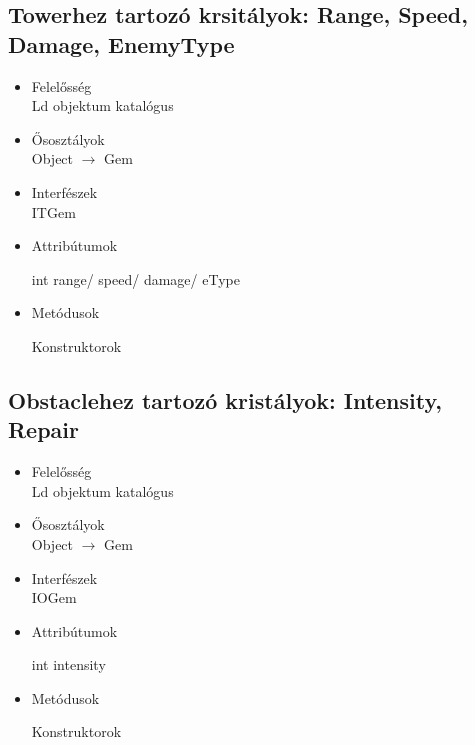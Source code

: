 \subsection{Towerhez tartozó krsitályok: Range, Speed, Damage, EnemyType}
\begin{itemize}
\item Felelősség\\
Ld objektum katalógus
\item Ősosztályok\\
Object $\rightarrow$ Gem
\item Interfészek\\
ITGem
\item Attribútumok\\
	\begin{description}
		\item[int range/ speed/ damage/ eType] 
		
	\end{description}
\item Metódusok\\
	\begin{description}
		\item[Konstruktorok]
		
	\end{description}
\end{itemize}
\subsection{Obstaclehez tartozó kristályok: Intensity, Repair}
\begin{itemize}
\item Felelősség\\
Ld objektum katalógus
\item Ősosztályok\\
Object $\rightarrow$ Gem
\item Interfészek\\
IOGem

\item Attribútumok\\
	\begin{description}
		\item[int intensity] 
		
	\end{description}
\item Metódusok\\
	\begin{description}
		\item[Konstruktorok]
		
	\end{description}
\end{itemize}
